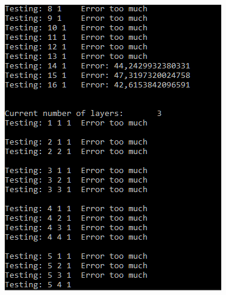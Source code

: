 \documentclass[12pt,a4paper]{article}
\begin{document}
\includegraphics[width=0.4\linewidth]{media/program6}\\
\end{document}
